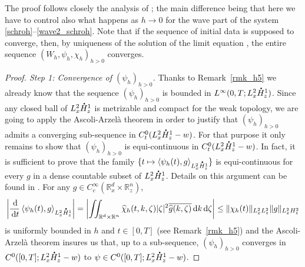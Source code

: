\documentclass[JEP,XML,SOM,NoEqCountersInSection,NoFloatCountersInSection,Unicode,published]{cedram}
\newcommand\mto{\mathchoice{\longmapsto}{\mapsto}{\mapsto}{\mapsto}}
\let\hat\oldhat
\theoremstyle{definition}
\newcommand*{\overbigdot}[1]{%
\accentset{\mbox{\large\bfseries .}}{#1}}
\let\hat\widehat
\newcommand{\R}{\mathbb{R}}
\newcommand{\ud}{\, {\mathrm{d}}}
\begin{document}
The proof follows closely the analysis of \cite{Lions_Paul_Wigner};
the main difference being that here we have to control also what happens as $h\to 0$ for the wave part of the system \eqref{schroh}--\eqref{wave2_schroh}.
Note that if the sequence of initial data is supposed to converge, then, by uniqueness of the solution of the limit equation \cite[Th.\,4]{dBGV}, the entire sequence
$(W_{h}, \psi_{h},\chi_{h})_{h>0}$ converges.

\begin{proof}[Proof. Step 1: Convergence of $(\psi_{h})_{h>0}$]
Thanks to Remark~\ref{rmk_h5} we already know that the sequence $(\psi_{h})_{h>0}$ is bounded in $L^{\infty}(0,T;L_{x}^{2}\overbigdot{H}_{z}^{1})$. Since any closed ball of $L_{x}^{2}\overbigdot{H}_{z}^{1}$ is metrizable and compact for the weak topology, we are going to apply the Ascoli-Arzelà theorem in order to justify that $(\psi_{h})_{h>0}$ admits a converging sub-sequence in $C_{t}^{0}(L_{x}^{2}\overbigdot{H}_{z}^{1}-w)$. For that purpose it only remains to show that $(\psi_{h})_{h>0}$ is equi-continuous in $C_{t}^{0}(L_{x}^{2}\overbigdot{H}_{z}^{1}-w)$. In fact, it is sufficient to prove that the family $\{t\mto \langle \psi_{h}(t),g\rangle_{L_{x}^{2}\overbigdot{H}_{z}^{1}}\}$ is equi-continuous for every $g$ in a dense countable subset of $L_{x}^{2}\overbigdot{H}_{z}^{1}$. Details on this argument can be found \eg in \cite[App.\,C]{PLL}.
For any $g\in C_{c}^{\infty}(\R_{x}^{d}\times\R_{z}^{n})$,
\[
\left|\frac{\ud}{\ud t}\left\langle\psi_{h}(t),g\right\rangle_{L_{x}^{2}\overbigdot{H}_{z}^{1}}\right|=\left|\iint_{\R^{d}\times\R^{n}}\hat{\chi}_{h}(t,k,\zeta)|\zeta|^{2}\overline{\hat{g}(k,\zeta)}\ud k\ud\zeta\right|\leq\|\chi_{h}(t)\|_{L_{x}^{2}L_{z}^{2}}\|g\|_{L_{x}^{2}H_{z}^{2}}
\]
is uniformly bounded in $h$ and $t\in[0,T]$ (see Remark~\ref{rmk_h5}) and the Ascoli-Arzelà theorem insures us that, up to a sub-sequence, $(\psi_{h})_{h>0}$ converges in \hbox{$C^{0}([0,T];L_{x}^{2}\overbigdot{H}_{z}^{1}-w)$} to $\psi\in C^{0}([0,T];L_{x}^{2}\overbigdot{H}_{z}^{1}-w)$.


\end{proof}
\end{document}
